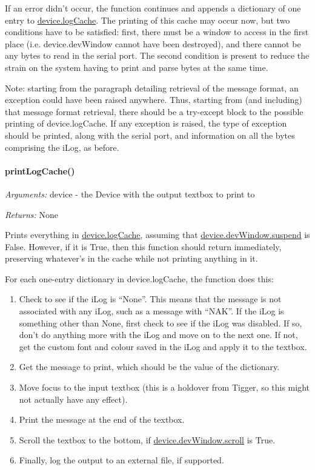 \documentclass[12pt,letterpaper]{article}
\begin{document}
If an error didn't occur, the function continues and appends a dictionary of one entry to \hyperref[4.3.2.2.23]{device.logCache}. The printing of this cache may occur now, but two conditions have to be satisfied: first, there must be a window to access in the first place (i.e. device.devWindow cannot have been destroyed), and there cannot be any bytes to read in the serial port. The second condition is present to reduce the strain on the system having to print and parse bytes at the same time.

Note: starting from the paragraph detailing retrieval of the message format, an exception could have been raised anywhere. Thus, starting from (and including) that message format retrieval, there should be a try-except block to the possible printing of device.logCache. If any exception is raised, the type of exception should be printed, along with the serial port, and information on all the bytes comprising the iLog, as before.



%
%
\paragraph{printLogCache()}
\label{4.6.1.3}

\emph{Arguments:} device - the Device with the output textbox to print to

\emph{Returns:} None

Prints everything in \hyperref[4.3.2.2.23]{device.logCache}, assuming that \hyperref[4.3.2.3.2]{device.devWindow.suspend} is False. However, if it is True, then this function should return immediately, preserving whatever's in the cache while not printing anything in it.

For each one-entry dictionary in device.logCache, the function does this:

\begin{enumerate}

\item Check to see if the iLog is ``None''. This means that the message is not associated with any iLog, such as a message with ``NAK''. If the iLog is something other than None, first check to see if the iLog was disabled. If so, don't do anything more with the iLog and move on to the next one. If not, get the custom font and colour saved in the iLog and apply it to the textbox.

\item Get the message to print, which should be the value of the dictionary.

\item Move focus to the input textbox (this is a holdover from Tigger, so this might not actually have any effect).

\item Print the message at the end of the textbox.

\item Scroll the textbox to the bottom, if \hyperref[4.3.2.3.1]{device.devWindow.scroll} is True.

\item Finally, log the output to an external file, if supported.

\end{enumerate}
\end{document}
